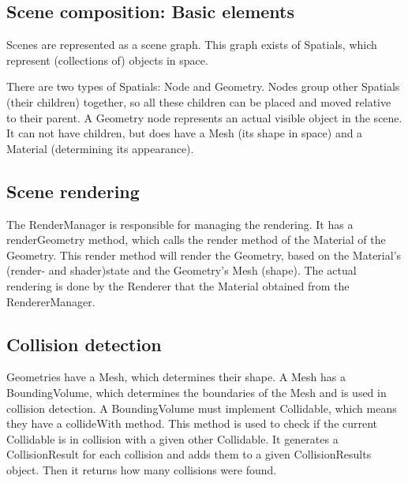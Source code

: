 \documentclass[a4paper, 10pt]{article}
\begin{document}

\subsection{Scene composition: Basic elements}
\label{sec:scene_composition}
Scenes are represented as a scene graph.
This graph exists of Spatials, which represent (collections of) objects in space. 

There are two types of Spatials: Node and Geometry.
Nodes group other Spatials (their children) together, 
so all these children can be placed and moved relative to their parent.
A Geometry node represents an actual visible object in the scene.
It can not have children, but does have a Mesh (its shape in space) 
and a Material (determining its appearance).

\subsection{Scene rendering}
\label{sec:scene_rendering}
The RenderManager is responsible for managing the rendering.
It has a renderGeometry method, which calls the render method
of the Material of the Geometry.
This render method will render the Geometry,
based on the Material's (render- and shader)state 
and the Geometry's Mesh (shape).
The actual rendering is done by the Renderer
that the Material obtained from the RendererManager.




\subsection{Collision detection}
\label{sec:collision_detection}
Geometries have a Mesh, which determines their shape.
A Mesh has a BoundingVolume, which determines the
boundaries of the Mesh and is used in collision detection.
A BoundingVolume must implement Collidable,
which means they have a collideWith method.
This method is used to check if the current Collidable
is in collision with a given other Collidable.
It generates a CollisionResult for each collision and adds
them to a given CollisionResults object.
Then it returns how many collisions were found.
\end{document}
